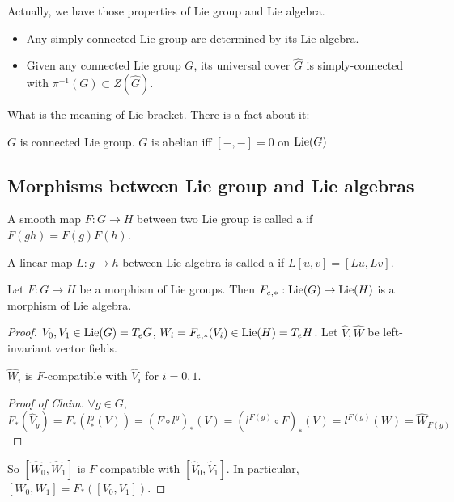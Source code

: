 Actually, we have those properties of Lie group and Lie algebra.
\begin{itemize}
    \item Any simply connected Lie group are determined by its Lie algebra.
    \item Given any connected Lie group  $ G $, its universal cover  $ \hat{G} $  is simply-connected with  $ \pi^{-1}(G)\subset Z(\hat{G}) $. 
\end{itemize}
What is the meaning of Lie bracket. There is a fact about it:
\begin{fact}
     $ G $ is connected Lie group.  $ G $ is abelian iff  $ [-,-]=0 $ on  $ \mathrm{Lie}(G) $    
\end{fact}
\subsection{Morphisms between Lie group and Lie algebras}
A smooth map  $ F:G\rightarrow H $ between two Lie group is called a  if  $ F(gh)=F(g)F(h) $.

A linear map  $ L:g\rightarrow h$ between Lie algebra is called a  if  $ L[u,v]=[Lu,Lv] $. 
\begin{proposition}
     Let  $ F:G\rightarrow H $ be a morphism of Lie groups. Then  $ F_{e,*}:\mathrm{Lie}(G)\rightarrow \mathrm{Lie}(H) $ is a morphism of Lie algebra.  
\end{proposition}
\begin{proof}
      $ V_0,V_1\in \mathrm{Lie}(G)=T_eG $,  $ W_i=F_{e,*}(V_i)\in \mathrm{Lie}(H)=T_eH $. Let  $ \hat{V},\hat{W} $ be left-invariant vector fields.   
     \begin{claim}
          $ \hat{W}_i $ is  $ F $-compatible with  $ \hat{V}_i $ for  $ i=0,1 $.    
     \end{claim}
     \begin{proof}[Proof of Claim]
          $ \forall g\in G $,  $ F_*(\hat{V}_g)=F_*(l_*^g(V))=(F\circ l^g)_*(V)=(l^{F(g)}\circ F)_*(V)=l^{F(g)}(W)=\hat{W}_{F(g)} $  
     \end{proof}
     So  $ [\hat{W}_0,\hat{W}_1] $ is  $ F $-compatible with  $ [\hat{V}_0,\hat{V}_1] $. In particular,  $ [W_0,W_1]=F_*([V_0,V_1]) $.  
\end{proof}


 